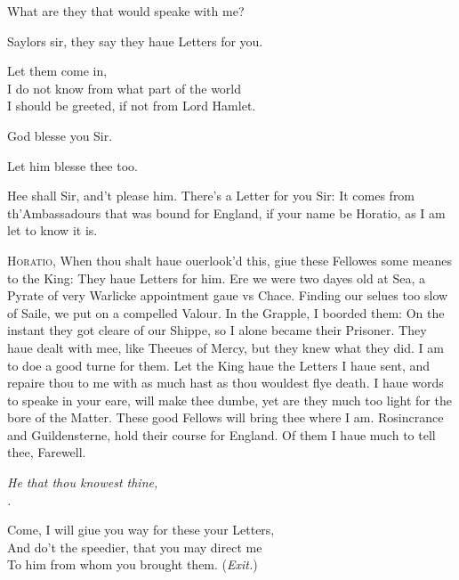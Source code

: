 \documentclass[a5paper,DIV=calc,11pt]{scrbook}
\begin{document}
\begin{drama*}
    \horspeaks What are they that would speake with me?

     Saylors sir, they say they haue Letters for you.

    \horspeaks Let them come in,\\
    I do not know from what part of the world\\
    I should be greeted, if not from Lord Hamlet.\\


     God blesse you Sir.

    \horspeaks  Let him blesse thee too.

     Hee shall Sir, and't please him. There's a Letter for you Sir: It comes from th'Ambassadours that was bound for England, if your name be Horatio, as I am let to know it is.

    \lettrine{H}{oratio}, When thou shalt haue ouerlook'd this, giue these Fellowes some meanes to the King: They haue Letters for him. Ere we were two dayes old at Sea, a Pyrate of very Warlicke appointment gaue vs Chace. Finding our selues too slow of Saile, we put on a compelled Valour. In the Grapple, I boorded them: On the instant they got cleare of our Shippe, so I alone became their Prisoner. They haue dealt with mee, like Theeues of Mercy, but they knew what they did. I am to doe a good turne for them. Let the King haue the Letters I haue sent, and repaire thou to me with as much hast as thou wouldest flye death. I haue words to speake in your eare, will make thee dumbe, yet are they much too light for the bore of the Matter. These good Fellows will bring thee where I am. Rosincrance and Guildensterne, hold their course for England. Of them I haue much to tell thee, Farewell.\\
    \begin{flushright}
        \textit{He that thou knowest thine,\\
        \ham.}
    \end{flushright}
    Come, I will giue you way for these your Letters,\\
    And do't the speedier, that you may direct me\\
    To him from whom you brought them. \hfill(\textit{Exit.})
\end{drama*}

\scene
\end{document}
